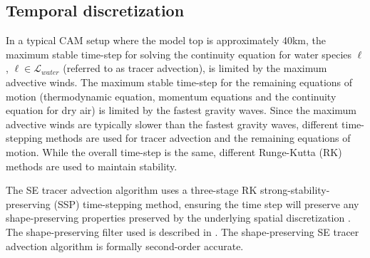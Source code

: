 \documentclass{agujournal}
\begin{document}
{%

\subsection{Temporal discretization}
In a typical CAM setup where the model top is approximately 40km, the maximum stable time-step for solving the continuity equation for water species $\ell$, $\ell \in \mathcal{L}_{water}$ (referred to as tracer advection), is limited by the maximum advective winds. The maximum stable time-step for the remaining equations of motion (thermodynamic equation, momentum equations and the continuity equation for dry air) is limited by the fastest gravity waves.  Since the maximum advective winds are typically slower than the fastest gravity waves, different time-stepping methods are used for tracer advection and the remaining equations of motion. While the overall time-step is the same, different Runge-Kutta (RK) methods are used to maintain stability. 

The SE tracer advection algorithm uses a three-stage RK strong-stability-preserving (SSP) time-stepping method, ensuring the time step will preserve any shape-preserving properties preserved by the underlying spatial discretization \citep{SR2002SIAM}. The shape-preserving filter used is described in \citet{GTS2014JCP}. The shape-preserving SE tracer advection algorithm is formally second-order accurate.

}
\end{document}
